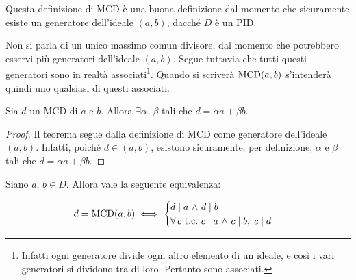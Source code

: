 \documentclass[11pt]{scrbook}
\begin{document}
\begin{remark*}
    Questa definizione di MCD è una buona definizione dal momento che sicuramente
    esiste un generatore dell'ideale $(a,b)$, dacché $D$ è un PID.
\end{remark*}

\begin{remark*}
    Non si parla di un unico massimo comun divisore, dal momento che
    potrebbero esservi più generatori dell'ideale $(a,b)$. Segue tuttavia che tutti questi generatori sono in realtà
    associati\footnote{Infatti ogni generatore divide ogni
        altro elemento di un ideale, e così i vari generatori si
        dividono tra di loro. Pertanto sono associati.}.
    Quando si scriverà
    $\operatorname{MCD}(a,b)$ s'intenderà quindi uno qualsiasi di questi associati.
\end{remark*}

\begin{theorem}
    \label{th:bezout}
    Sia $d$ un MCD di $a$ e $b$. Allora
    $\exists \alpha$, $\beta$ tali che $d = \alpha a + \beta b$.
\end{theorem}

\begin{proof}
    Il teorema segue dalla definizione di MCD come generatore
    dell'ideale $(a,b)$. Infatti, poiché $d \in (a,b)$, esistono
    sicuramente, per definizione, $\alpha$ e $\beta$ tali che
    $d = \alpha a + \beta b$.
\end{proof}

\begin{proposition}
    \label{prop:mcd}
    Siano $a$, $b \in D$. Allora vale la seguente equivalenza:

    \[ d = \MCD(a, b) \iff \begin{cases} d \mid a \,\land\, d \mid b \\ \forall c \text{ t.c.\ } c \mid a \,\land\, c \mid b,\;c \mid d\end{cases}\]
\end{proposition}
\end{document}
